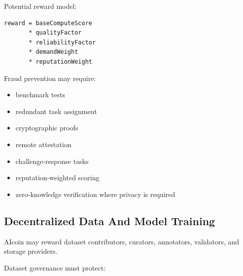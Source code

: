 ﻿\documentclass[12pt]{article}
\begin{document}
Potential reward model:

\begin{verbatim}
reward = baseComputeScore
       * qualityFactor
       * reliabilityFactor
       * demandWeight
       * reputationWeight
\end{verbatim}

Fraud prevention may require:

\begin{itemize}
  \item benchmark tests
\end{itemize}
\begin{itemize}
  \item redundant task assignment
\end{itemize}
\begin{itemize}
  \item cryptographic proofs
\end{itemize}
\begin{itemize}
  \item remote attestation
\end{itemize}
\begin{itemize}
  \item challenge-response tasks
\end{itemize}
\begin{itemize}
  \item reputation-weighted scoring
\end{itemize}
\begin{itemize}
  \item zero-knowledge verification where privacy is required
\end{itemize}

\subsection{Decentralized Data And Model Training}


AIcoin may reward dataset contributors, curators, annotators, validators, and storage providers.

Dataset governance must protect:
\end{document}
